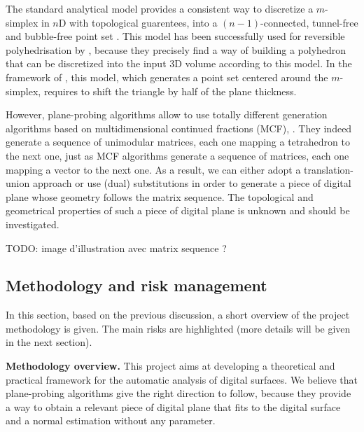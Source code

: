 The standard analytical model provides a consistent way to discretize a $m$-simplex
in $n$D with topological guarentees, \ie into a $(n-1)$-connected, tunnel-free
and bubble-free point set \cite{Andres2003}. This model has been successfully
used for reversible polyhedrisation by \citeauthor*{Sivignon2004} \cite{Sivignon2004},
because they precisely find a way of building a polyhedron that can be
discretized into the input 3D volume according to this model.
In the framework of \cite{LPRJMIV2017}, this model, which generates a point set
centered around the $m$-simplex, requires to shift the triangle by half of the
plane thickness.

However, plane-probing algorithms allow to use totally different generation algorithms
based on multidimensional continued fractions (MCF), \eg \cite{Fernique2009,Jamet2016}. 
They indeed generate a sequence of unimodular matrices, each one mapping a tetrahedron to
the next one, just as MCF algorithms generate a sequence of matrices, each one mapping
a vector to the next one. As a result, we can either adopt a translation-union approach \cite{Jamet2016}
or use (dual) substitutions \cite{Fernique2009} in order to generate a piece
of digital plane whose geometry follows the matrix sequence. The topological and geometrical
properties of such a piece of digital plane is unknown and should be investigated. 

TODO: image d'illustration avec matrix sequence ?



\subsection{Methodology and risk management}
\label{sec:methodo}


In this section, based on the previous discussion, a short overview of
the project methodology is given. The main risks are highlighted (more
details will be given in the next section).  

\noindent\textbf{Methodology overview.}
This project aims at developing a theoretical and practical framework for the automatic
analysis of digital surfaces. We believe that plane-probing algorithms give the right
direction to follow, because they provide a way to obtain a relevant piece of digital
plane that fits to the digital surface and a normal estimation without any parameter. 

